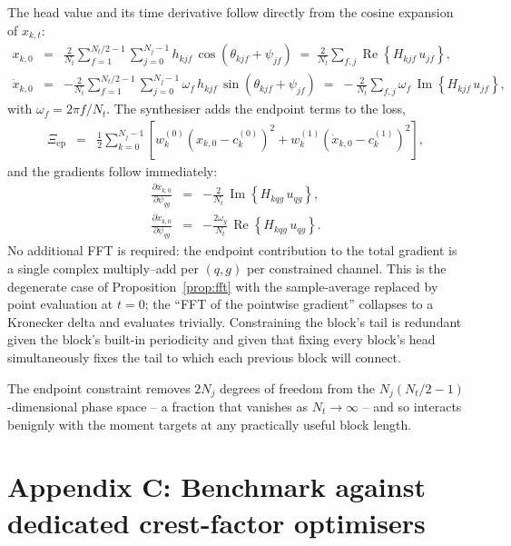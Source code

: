 \documentclass[10pt,a4paper]{article}
\numberwithin{equation}{section}
\newcommand{\block}[1]{\left[#1\right]}
\newcommand{\mat}[1]{\left(#1\right)}
\newcommand{\re}[1]{\operatorname{Re}\left\{#1\right\}}
\newcommand{\im}[1]{\operatorname{Im}\left\{#1\right\}}
\newcommand{\m}[1]{\mathrm{#1}}
\begin{document}
The head value and its time derivative follow directly from the cosine expansion of $x_{k,t}$:
\begin{eqnarray}
x_{k, 0}      &=& \frac{2}{N_t}\sum_{f=1}^{N_t/2-1}\sum_{j=0}^{N_j-1} h_{k j f}\,\cos\mat{\theta_{k j f}+\psi_{j f}}
	\;=\; \frac{2}{N_t}\sum_{f,j}\re{H_{k j f}\, u_{j f}}, \\
\dot x_{k, 0} &=& -\frac{2}{N_t}\sum_{f=1}^{N_t/2-1}\sum_{j=0}^{N_j-1}\omega_f\,h_{k j f}\,\sin\mat{\theta_{k j f}+\psi_{j f}}
	\;=\; -\frac{2}{N_t}\sum_{f,j}\omega_f\,\im{H_{k j f}\, u_{j f}},
\end{eqnarray}
with $\omega_f = 2\pi f / N_t$. The synthesiser adds the endpoint terms to the loss,
\begin{eqnarray}
\Xi_{\m{ep}} &=& \frac{1}{2}\sum_{k=0}^{N_j-1}\block{w^{(0)}_k\mat{x_{k, 0} - c^{(0)}_k}^2 + w^{(1)}_k\mat{\dot x_{k, 0} - c^{(1)}_k}^2},
\end{eqnarray}
and the gradients follow immediately:
\begin{eqnarray}
\frac{\partial x_{k, 0}}{\partial \psi_{q g}}      &=& -\frac{2}{N_t}\,\im{H_{k q g}\, u_{q g}}, \\
\frac{\partial \dot x_{k, 0}}{\partial \psi_{q g}} &=& -\frac{2\omega_g}{N_t}\,\re{H_{k q g}\, u_{q g}}.
\end{eqnarray}
No additional FFT is required: the endpoint contribution to the total gradient is a single complex multiply--add per $(q,g)$ per constrained channel. This is the degenerate case of Proposition~\ref{prop:fft} with the sample-average replaced by point evaluation at $t{=}0$; the ``FFT of the pointwise gradient'' collapses to a Kronecker delta and evaluates trivially. Constraining the block's tail is redundant given the block's built-in periodicity and given that fixing every block's head simultaneously fixes the tail to which each previous block will connect.

The endpoint constraint removes $2 N_j$ degrees of freedom from the $N_j\mat{N_t/2-1}$-dimensional phase space -- a fraction that vanishes as $N_t\to\infty$ -- and so interacts benignly with the moment targets at any practically useful block length.

\section*{Appendix C: Benchmark against dedicated crest-factor optimisers}\label{app:crestbench}
\end{document}
